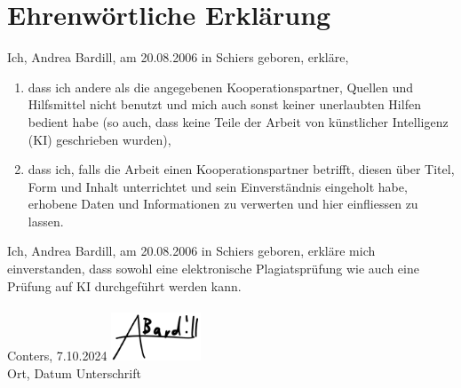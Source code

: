 \chapter*{Ehrenwörtliche Erklärung}

Ich, Andrea Bardill, am 20.08.2006 in Schiers geboren, erkläre, \\
\begin{enumerate}
    \item dass ich andere als die angegebenen Kooperationspartner, Quellen und Hilfsmittel nicht benutzt und mich auch sonst keiner unerlaubten Hilfen bedient habe (so auch, dass keine Teile der Arbeit von künstlicher Intelligenz (KI) geschrieben wurden),
    \item dass ich, falls die Arbeit einen Kooperationspartner betrifft, diesen über Titel, Form und Inhalt
unterrichtet und sein Einverständnis eingeholt habe, erhobene Daten und Informationen zu verwerten
und hier einfliessen zu lassen.
\end{enumerate}
Ich, Andrea Bardill, am 20.08.2006 in Schiers geboren, erkläre mich einverstanden, dass sowohl eine elektronische Plagiatsprüfung wie auch eine Prüfung auf KI durchgeführt werden kann.\\\\
Conters, 7.10.2024 \hfill \includegraphics[width=0.2\textwidth]{Picture/signature (1).png} \\
Ort, Datum \hfill Unterschrift